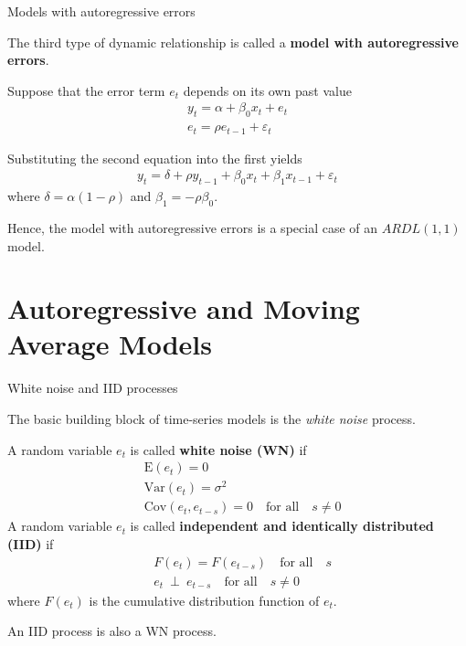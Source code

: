 \documentclass[10pt,aspectratio=169]{beamer}  %
\begin{document}

\begin{frame}{Models with autoregressive errors}

    \bigskip

    The third type of dynamic relationship is called a \textbf{model with autoregressive errors}.

    \medskip
    Suppose that the error term $ e_{t} $ depends on its own past value
    \begin{align*}
        y_{t} = \alpha + \beta_{0} x_{t} + e_{t} \\
        e_{t} = \rho e_{t-1} + \varepsilon_{t}
    \end{align*}

    Substituting the second equation into the first yields
    \begin{align*}
        y_{t} = \delta + \rho y_{t-1} + \beta_{0} x_{t} + \beta_{1} x_{t-1} + \varepsilon_{t}
    \end{align*}
    where $ \delta = \alpha \left( 1-\rho \right) $ and $ \beta_{1} = - \rho \beta_{0} $.

    Hence, the model with autoregressive errors is a special case of an $ ARDL(1, 1) $ model.

\end{frame}


\section{Autoregressive and Moving Average Models}


\begin{frame}{White noise and IID processes}

    \bigskip
    The basic building block of time-series models is the \textit{white noise} process.

    \medskip
    A random variable $ e_{t} $ is called \textbf{white noise (WN)} if
    \begin{align*}
        & \mathrm{E}(e_{t}) = 0 \\
        & \mathrm{Var}(e_{t}) = \sigma^2 \\
        & \mathrm{Cov}(e_{t}, e_{t-s}) = 0 \quad \text{for all} \quad s \neq 0
    \end{align*}
    A random variable $ e_{t} $ is called \textbf{independent and identically distributed (IID)} if
    \begin{align*}
        & F \left( e_{t} \right) = F \left( e_{t-s} \right) \quad \text{for all} \quad s \\
        & e_{t} \: \perp \: e_{t-s} \quad \text{for all} \quad s \neq 0
    \end{align*}
    where $ F \left( e_{t} \right) $ is the cumulative distribution function of $ e_{t} $.

    \medskip
    An IID process is also a WN process.

\end{frame}
\end{document}
